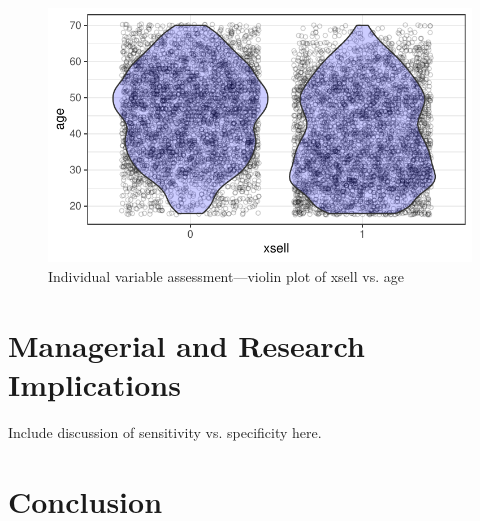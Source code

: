 \documentclass[12pt,a4paper]{article}
\begin{document}
\begin{figure}[ht]
	\centering
  \includegraphics[scale=0.83]{figures/violin_age_xsell.pdf}
	\caption{Individual variable assessment---violin plot of xsell vs. age}
	\label{fig_lime_four}
\end{figure}




\section{Managerial and Research Implications} \label{sec_man_impl}
Include discussion of sensitivity vs. specificity here.
\section{Conclusion}




\clearpage
\appendix
\end{document}
